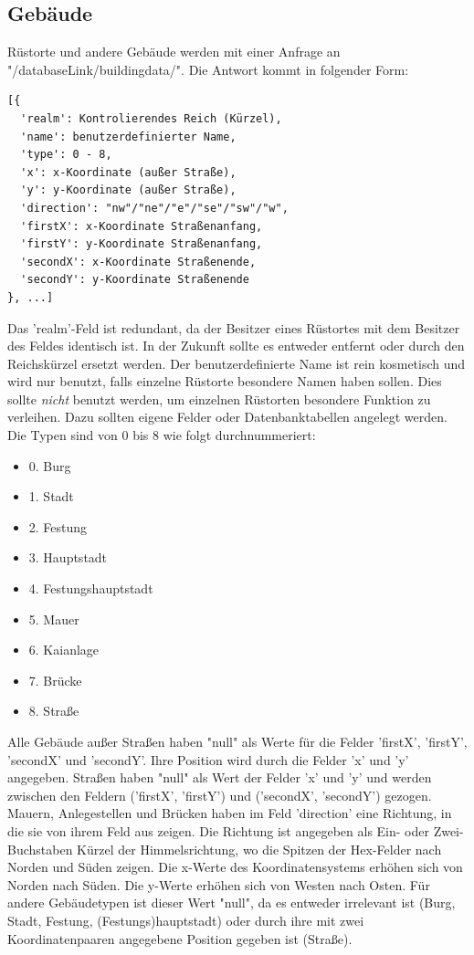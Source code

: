 \documentclass[11pt,a4paper,twocolumn]{article}
\begin{document}
\subsection{Gebäude}\label{ss:read_buildings}
Rüstorte und andere Gebäude werden mit einer Anfrage an "/databaseLink/buildingdata/". Die Antwort kommt in folgender Form:
\begin{lstlisting}
[{
  'realm': Kontrolierendes Reich (Kürzel),
  'name': benutzerdefinierter Name,
  'type': 0 - 8,
  'x': x-Koordinate (außer Straße),
  'y': y-Koordinate (außer Straße),
  'direction': "nw"/"ne"/"e"/"se"/"sw"/"w",
  'firstX': x-Koordinate Straßenanfang,
  'firstY': y-Koordinate Straßenanfang,
  'secondX': x-Koordinate Straßenende,
  'secondY': y-Koordinate Straßenende
}, ...]
\end{lstlisting}
Das 'realm'-Feld ist redundant, da der Besitzer eines Rüstortes mit dem Besitzer des Feldes identisch ist. In der Zukunft sollte es entweder entfernt oder durch den Reichskürzel ersetzt werden. Der benutzerdefinierte Name ist rein kosmetisch und wird nur benutzt, falls einzelne Rüstorte besondere Namen haben sollen. Dies sollte \emph{nicht} benutzt werden, um einzelnen Rüstorten besondere Funktion zu verleihen. Dazu sollten eigene Felder oder Datenbanktabellen angelegt werden. Die Typen sind von 0 bis 8 wie folgt durchnummeriert:
\begin{itemize}
	\item 0. Burg
	\item 1. Stadt
	\item 2. Festung
	\item 3. Hauptstadt
	\item 4. Festungshauptstadt
	\item 5. Mauer
	\item 6. Kaianlage
	\item 7. Brücke
	\item 8. Straße
\end{itemize} 
Alle Gebäude außer Straßen haben "null" als Werte für die Felder 'firstX', 'firstY', 'secondX' und 'secondY'. Ihre Position wird durch die Felder 'x' und 'y' angegeben. Straßen haben "null" als Wert der Felder 'x' und 'y' und werden zwischen den Feldern ('firstX', 'firstY') und ('secondX', 'secondY') gezogen.\\
Mauern, Anlegestellen und Brücken haben im Feld 'direction' eine Richtung, in die sie von ihrem Feld aus zeigen. Die Richtung ist angegeben als Ein- oder Zwei-Buchstaben Kürzel der Himmelsrichtung, wo die Spitzen der Hex-Felder nach Norden und Süden zeigen. Die x-Werte des Koordinatensystems erhöhen sich von Norden nach Süden. Die y-Werte erhöhen sich von Westen nach Osten. Für andere Gebäudetypen ist dieser Wert "null", da es entweder irrelevant ist (Burg, Stadt, Festung, (Festungs)hauptstadt) oder durch ihre mit zwei Koordinatenpaaren angegebene Position gegeben ist (Straße).
\end{document}
